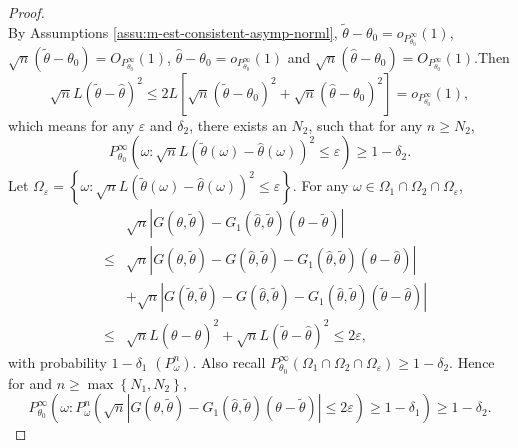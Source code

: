 \documentclass[oneside,english]{amsbook}
\numberwithin{section}{chapter}
\numberwithin{equation}{section}
\numberwithin{figure}{section}
\theoremstyle{plain}
\theoremstyle{plain}
\theoremstyle{definition}
\theoremstyle{plain}
\theoremstyle{plain}
\theoremstyle{remark}
\theoremstyle{definition}
\theoremstyle{definition}
\begin{document}
\begin{proof}
\[\]
By Assumptions \ref{assu:m-est-consistent-asymp-norml}, $\tilde{\theta}-\theta_{0}=o_{P_{\theta_{0}}^{\infty}}\left(1\right)$,
$\sqrt{n}\left(\tilde{\theta}-\theta_{0}\right)=O_{P_{\theta_{0}}^{\infty}}\left(1\right)$,
$\hat{\theta}-\theta_{0}=o_{P_{\theta_{0}}^{\infty}}\left(1\right)$
and $\sqrt{n}\left(\hat{\theta}-\theta_{0}\right)=O_{P_{\theta_{0}}^{\infty}}\left(1\right).$Then
\[
\sqrt{n}L\left(\tilde{\theta}-\hat{\theta}\right)^{2}\le2L\left[\sqrt{n}\left(\tilde{\theta}-\theta_{0}\right)^{2}+\sqrt{n}\left(\hat{\theta}-\theta_{0}\right)^{2}\right]=o_{P_{\theta_{0}}^{\infty}}\left(1\right),
\]
which means for any $\varepsilon$ and $\delta_{2}$, there exists
an $N_{2}$, such that for any $n\ge N_{2}$, 
\[
P_{\theta_{0}}^{\infty}\left(\omega:\sqrt{n}L\left(\tilde{\theta}\left(\omega\right)-\hat{\theta}\left(\omega\right)\right)^{2}\le\varepsilon\right)\ge1-\delta_{2}.
\]
Let $\Omega_{\varepsilon}=\left\{ \omega:\sqrt{n}L\left(\tilde{\theta}\left(\omega\right)-\hat{\theta}\left(\omega\right)\right)^{2}\le\varepsilon\right\} $.
For any $\omega\in\Omega_{1}\cap\Omega_{2}\cap\Omega_{\varepsilon}$,
\begin{eqnarray*}
 &  & \sqrt{n}\left|G\left(\theta,\tilde{\theta}\right)-G_{1}\left(\hat{\theta},\tilde{\theta}\right)\left(\theta-\tilde{\theta}\right)\right|\\
 & \le & \sqrt{n}\left|G\left(\theta,\tilde{\theta}\right)-G\left(\hat{\theta},\tilde{\theta}\right)-G_{1}\left(\hat{\theta},\tilde{\theta}\right)\left(\theta-\hat{\theta}\right)\right|\\
 &  & +\sqrt{n}\left|G\left(\tilde{\theta},\tilde{\theta}\right)-G\left(\hat{\theta},\tilde{\theta}\right)-G_{1}\left(\hat{\theta},\tilde{\theta}\right)\left(\tilde{\theta}-\hat{\theta}\right)\right|\\
 & \le & \sqrt{n}L\left(\theta-\hat{\theta}\right)^{2}+\sqrt{n}L\left(\tilde{\theta}-\hat{\theta}\right)^{2}\le2\varepsilon,
\end{eqnarray*}
with probability $1-\delta_{1}$ $\left(P_{\omega}^{n}\right)$. Also
recall $P_{\theta_{0}}^{\infty}\left(\Omega_{1}\cap\Omega_{2}\cap\Omega_{\varepsilon}\right)\ge1-\delta_{2}$.
Hence for and $n\ge\max\left\{ N_{1},N_{2}\right\} $, 
\[
P_{\theta_{0}}^{\infty}\left(\omega:P_{\omega}^{n}\left(\sqrt{n}\left|G\left(\theta,\tilde{\theta}\right)-G_{1}\left(\hat{\theta},\tilde{\theta}\right)\left(\theta-\tilde{\theta}\right)\right|\le2\varepsilon\right)\ge1-\delta_{1}\right)\ge1-\delta_{2}.
\]
\end{proof}
\end{document}
